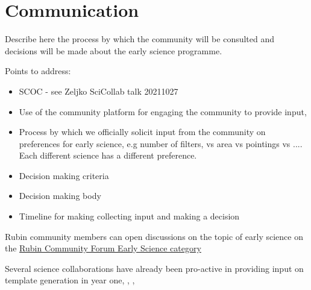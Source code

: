 
\section{Communication}

Describe here the process by which the community will be consulted and decisions will be made about the early science programme. 

Points to address:
\begin{itemize}
\item SCOC - see Zeljko SciCollab talk 20211027
\item Use of the community platform for engaging the community to provide input,
\item Process by which we officially solicit  input from the community on preferences for early science, e.g number of filters, vs area vs pointings vs .... Each different science has a different preference. 
\item Decision making criteria 
\item Decision making body
\item Timeline for making collecting input and making a decision
\end{itemize}

Rubin community members can open discussions on the topic of early science on the \href{https://community.lsst.org/t/about-the-early-science-category/5775}{Rubin Community Forum Early Science category}

Several science collaborations have already been pro-active in providing input on template generation in year one, , , 
